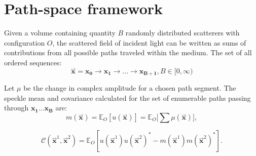 \section{Path-space framework}
Given a volume containing quantity $B$ randomly distributed scatterers with configuration $O$, the scattered field of incident light can be written as sums of contributions from all possible paths traveled within the medium. The set of all ordered sequences:
%
\begin{equation} 
    \overset{\rightharpoonup}{\mathbf{x}} = \mathbf{x_0} \rightarrow \mathbf{x_1} \rightarrow ... \rightarrow \mathbf{x_{B+1}}, B \in [0, \infty)
\end{equation}

Let $\mu$ be the change in complex amplitude for a chosen path segment. The speckle mean and covariance calculated for the set of enumerable paths passing through $\mathbf{x_1}...\mathbf{x_B}$ are:
%
\begin{equation}
    m(\overset{\rightharpoonup}{\mathbf{x}}) = \mathbb{E}_O[ u(\overset{\rightharpoonup}{\mathbf{x}}) ] = \mathbb{E}_O \bigg[ \sum \mu(\overset{\rightharpoonup}{\mathbf{x}}) \bigg],
\end{equation}

\begin{equation}
    \mathcal{C}(\overset{\rightharpoonup}{\mathbf{x}}^1,\overset{\rightharpoonup}{\mathbf{x}}^2) = \mathbb{E}_O[ u(\overset{\rightharpoonup}{\mathbf{x}}^1) u(\overset{\rightharpoonup}{\mathbf{x}}^2)^*  - m(\overset{\rightharpoonup}{\mathbf{x}}^1) m(\overset{\rightharpoonup}{\mathbf{x}}^2)^*].
\end{equation}




